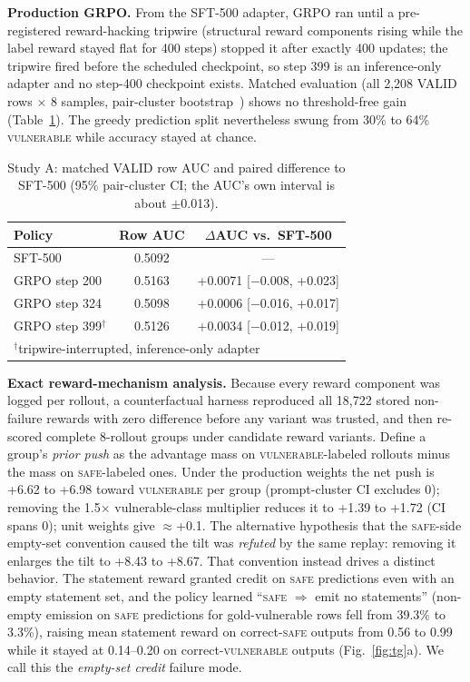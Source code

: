 \documentclass[journal]{IEEEtran}
\newcommand{\vuln}{\textsc{vulnerable}}
\newcommand{\safe}{\textsc{safe}}
\begin{document}
\textbf{Production GRPO.} From the SFT-500 adapter, GRPO ran until a pre-registered reward-hacking tripwire (structural reward components rising while the label reward stayed flat for 400 steps) stopped it after exactly 400 updates; the tripwire fired before the scheduled checkpoint, so step 399 is an inference-only adapter and no step-400 checkpoint exists. Matched evaluation (all 2,208 VALID rows $\times$ 8 samples, pair-cluster bootstrap~\cite{efron}) shows no threshold-free gain (Table~\ref{tab:e2}). The greedy prediction split nevertheless swung from 30\% to 64\% \vuln{} while accuracy stayed at chance.

\begin{table}[t]
\centering\footnotesize\setlength{\tabcolsep}{3.5pt}
\caption{Study A: matched VALID row AUC and paired difference to SFT-500 (95\% pair-cluster CI; the AUC's own interval is about $\pm$0.013).}
\label{tab:e2}
\begin{tabular}{lcc}
\toprule
Policy & Row AUC & $\Delta$AUC vs.\ SFT-500\\
\midrule
SFT-500 & 0.5092 & ---\\
GRPO step 200 & 0.5163 & +0.0071 [$-$0.008, +0.023]\\
GRPO step 324 & 0.5098 & +0.0006 [$-$0.016, +0.017]\\
GRPO step 399$^\dagger$ & 0.5126 & +0.0034 [$-$0.012, +0.019]\\
\multicolumn{3}{l}{\scriptsize $^\dagger$tripwire-interrupted, inference-only adapter}\\
\bottomrule
\end{tabular}
\end{table}

\textbf{Exact reward-mechanism analysis.} Because every reward component was logged per rollout, a counterfactual harness reproduced all 18,722 stored non-failure rewards with zero difference before any variant was trusted, and then re-scored complete 8-rollout groups under candidate reward variants. Define a group's \emph{prior push} as the advantage mass on \vuln{}-labeled rollouts minus the mass on \safe{}-labeled ones. Under the production weights the net push is +6.62 to +6.98 toward \vuln{} per group (prompt-cluster CI excludes 0); removing the 1.5$\times$ vulnerable-class multiplier reduces it to +1.39 to +1.72 (CI spans 0); unit weights give $\approx$+0.1. The alternative hypothesis that the \safe{}-side empty-set convention caused the tilt was \emph{refuted} by the same replay: removing it enlarges the tilt to +8.43 to +8.67. That convention instead drives a distinct behavior. The statement reward granted credit on \safe{} predictions even with an empty statement set, and the policy learned ``\safe{} $\Rightarrow$ emit no statements'' (non-empty emission on \safe{} predictions for gold-vulnerable rows fell from 39.3\% to 3.3\%), raising mean statement reward on correct-\safe{} outputs from 0.56 to 0.99 while it stayed at 0.14--0.20 on correct-\vuln{} outputs (Fig.~\ref{fig:tg}a). We call this the \emph{empty-set credit} failure mode.
\end{document}
